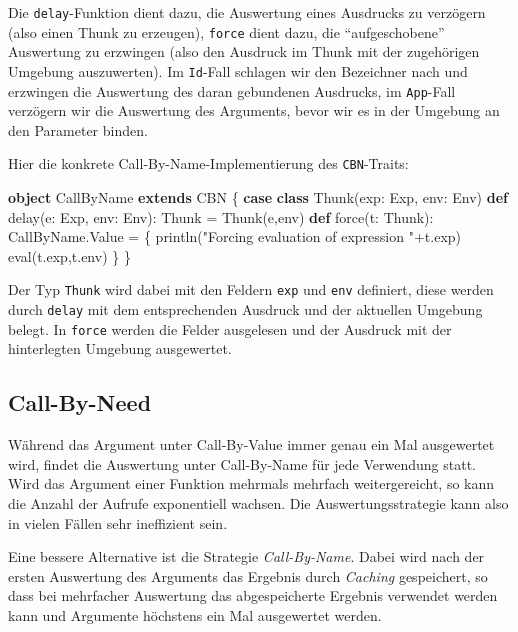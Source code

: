 \documentclass[]{article}
\newenvironment{Shaded}{}{}
\newcommand{\FunctionTok}[1]{\textcolor[rgb]{0.02,0.16,0.49}{#1}}
\newcommand{\KeywordTok}[1]{\textcolor[rgb]{0.00,0.44,0.13}{\textbf{#1}}}
\newcommand{\NormalTok}[1]{#1}
\newcommand{\StringTok}[1]{\textcolor[rgb]{0.25,0.44,0.63}{#1}}
\begin{document}
Die \texttt{delay}-Funktion dient dazu, die Auswertung eines Ausdrucks
zu verzögern (also einen Thunk zu erzeugen), \texttt{force} dient dazu,
die ``aufgeschobene'' Auswertung zu erzwingen (also den Ausdruck im
Thunk mit der zugehörigen Umgebung auszuwerten). Im \texttt{Id}-Fall
schlagen wir den Bezeichner nach und erzwingen die Auswertung des daran
gebundenen Ausdrucks, im \texttt{App}-Fall verzögern wir die Auswertung
des Arguments, bevor wir es in der Umgebung an den Parameter binden.

Hier die konkrete Call-By-Name-Implementierung des \texttt{CBN}-Traits:

\begin{Shaded}
\begin{Highlighting}[]
\KeywordTok{object}\NormalTok{ CallByName }\KeywordTok{extends}\NormalTok{ CBN \{}
  \KeywordTok{case} \KeywordTok{class} \FunctionTok{Thunk}\NormalTok{(exp: Exp, env: Env)}
  \KeywordTok{def} \FunctionTok{delay}\NormalTok{(e: Exp, env: Env): Thunk = }\FunctionTok{Thunk}\NormalTok{(e,env)}
  \KeywordTok{def} \FunctionTok{force}\NormalTok{(t: Thunk): CallByName.}\FunctionTok{Value}\NormalTok{ = \{}
    \FunctionTok{println}\NormalTok{(}\StringTok{"Forcing evaluation of expression "}\NormalTok{+t.}\FunctionTok{exp}\NormalTok{)}
    \FunctionTok{eval}\NormalTok{(t.}\FunctionTok{exp}\NormalTok{,t.}\FunctionTok{env}\NormalTok{)}
\NormalTok{  \}}
\NormalTok{\}}
\end{Highlighting}
\end{Shaded}

Der Typ \texttt{Thunk} wird dabei mit den Feldern \texttt{exp} und
\texttt{env} definiert, diese werden durch \texttt{delay} mit dem
entsprechenden Ausdruck und der aktuellen Umgebung belegt. In
\texttt{force} werden die Felder ausgelesen und der Ausdruck mit der
hinterlegten Umgebung ausgewertet.

\hypertarget{call-by-need}{%
\subsection{Call-By-Need}\label{call-by-need}}

Während das Argument unter Call-By-Value immer genau ein Mal ausgewertet
wird, findet die Auswertung unter Call-By-Name für jede Verwendung
statt. Wird das Argument einer Funktion mehrmals mehrfach
weitergereicht, so kann die Anzahl der Aufrufe exponentiell wachsen. Die
Auswertungsstrategie kann also in vielen Fällen sehr ineffizient sein.

Eine bessere Alternative ist die Strategie \emph{Call-By-Name}. Dabei
wird nach der ersten Auswertung des Arguments das Ergebnis durch
\emph{Caching} gespeichert, so dass bei mehrfacher Auswertung das
abgespeicherte Ergebnis verwendet werden kann und Argumente höchstens
ein Mal ausgewertet werden.
\end{document}
